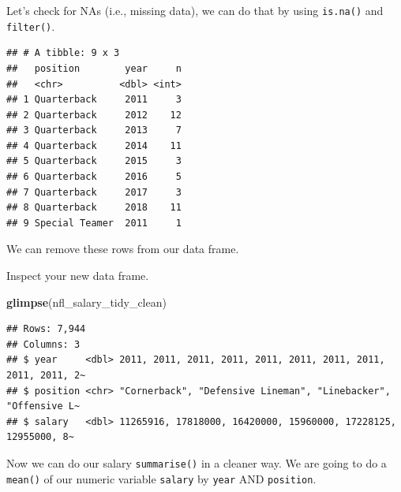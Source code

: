 \documentclass[
]{book}
\newenvironment{Shaded}{\begin{snugshade}}{\end{snugshade}}
\newcommand{\KeywordTok}[1]{\textcolor[rgb]{0.13,0.29,0.53}{\textbf{#1}}}
\newcommand{\NormalTok}[1]{#1}
\newcommand{\OperatorTok}[1]{\textcolor[rgb]{0.81,0.36,0.00}{\textbf{#1}}}
\newcommand{\StringTok}[1]{\textcolor[rgb]{0.31,0.60,0.02}{#1}}
\begin{document}
Let's check for NAs (i.e., missing data), we can do that by using \texttt{is.na()} and \texttt{filter()}.

\begin{Shaded}
\end{Shaded}

\begin{verbatim}
## # A tibble: 9 x 3
##   position        year     n
##   <chr>          <dbl> <int>
## 1 Quarterback     2011     3
## 2 Quarterback     2012    12
## 3 Quarterback     2013     7
## 4 Quarterback     2014    11
## 5 Quarterback     2015     3
## 6 Quarterback     2016     5
## 7 Quarterback     2017     3
## 8 Quarterback     2018    11
## 9 Special Teamer  2011     1
\end{verbatim}

We can remove these rows from our data frame.

\begin{Shaded}
\end{Shaded}

Inspect your new data frame.

\begin{Shaded}
\begin{Highlighting}[]
\KeywordTok{glimpse}\NormalTok{(nfl_salary_tidy_clean)}
\end{Highlighting}
\end{Shaded}

\begin{verbatim}
## Rows: 7,944
## Columns: 3
## $ year     <dbl> 2011, 2011, 2011, 2011, 2011, 2011, 2011, 2011, 2011, 2011, 2~
## $ position <chr> "Cornerback", "Defensive Lineman", "Linebacker", "Offensive L~
## $ salary   <dbl> 11265916, 17818000, 16420000, 15960000, 17228125, 12955000, 8~
\end{verbatim}

Now we can do our salary \texttt{summarise()} in a cleaner way. We are going to do a \texttt{mean()} of our numeric variable \texttt{salary} by \texttt{year} AND \texttt{position}.
\end{document}

